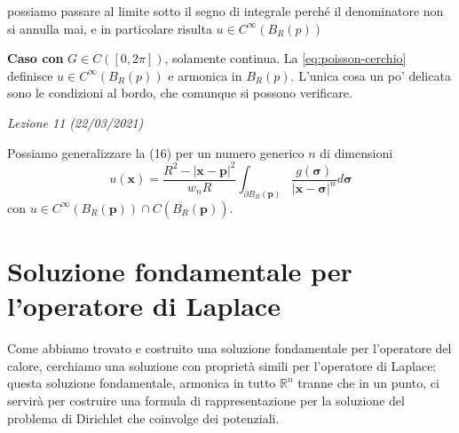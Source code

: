 \documentclass[10pt,a4paper,twoside,openright]{book}
\begin{document}
\begin{dimostrazione}
\begin{figure}[H]

\end{figure}
\FloatBarrier

possiamo passare al limite sotto il segno di integrale perché il denominatore non si annulla mai, e in particolare risulta $u\in C^{\infty }(B_{R}(p))$

\textbf{Caso con }$G\in C([ 0,2\pi ])$, solamente continua. La \eqref{eq:poisson-cerchio} definisce $u\in C^{\infty }(B_{R}(p))$ e armonica in $B_{R}(p)$. L'unica cosa un po' delicata sono le condizioni al bordo, che comunque si possono verificare.

\end{dimostrazione}

\textit{Lezione 11 (22/03/2021)}

Possiamo generalizzare la (16) per un numero generico $\displaystyle n$ di dimensioni
\begin{equation*}
	u(\mathbf{x}) =\frac{R^{2} -| \mathbf{x} -\mathbf{p}| ^{2}}{w_{n} R}\int _{\partial B_{R}(\mathbf{p})}\frac{g(\mathbf{\sigma })}{| \mathbf{x} -\mathbf{\sigma }| ^{n}} d\mathbf{\sigma }
\end{equation*}
con $\displaystyle u\in C^{\infty }( B_{R}(\mathbf{p})) \cap C\left(\overline{B_{R}}(\mathbf{p})\right)$.
\section{Soluzione fondamentale per l'operatore di Laplace}

Come abbiamo trovato e costruito una soluzione fondamentale per l'operatore del calore, cerchiamo una soluzione con proprietà simili per l'operatore di Laplace: questa soluzione fondamentale, armonica in tutto $\displaystyle \mathbb{R}^{n}$ tranne che in un punto, ci servirà per costruire una formula di rappresentazione per la soluzione del problema di Dirichlet che coinvolge dei potenziali.
\end{document}
